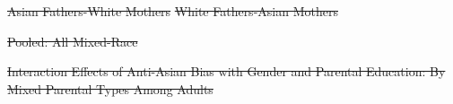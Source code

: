 \documentclass[12pt,english]{article}
\providecommand{\DIFdeltex}[1]{{\protect\color{red}\sout{#1}}}                      %
\providecommand{\DIFdelFL}[1]{\DIFdel{#1}} %
\providecommand{\DIFdel}[1]{\texorpdfstring{\DIFdeltex{#1}}{}} %
\begin{document}
{%
\DIFdelFL{Asian Fathers-White Mothers}}
{%
\DIFdelFL{White Fathers-Asian Mothers}}


{%
\DIFdelFL{Pooled: All Mixed-Race}}



{%
\DIFdelFL{Interaction Effects of Anti-Asian Bias with Gender and Parental Education: By Mixed Parental Types Among Adults}}
\DIFdelFL{\label{fig:interaction-coefs-aw-wa}
}%
\end{document}

